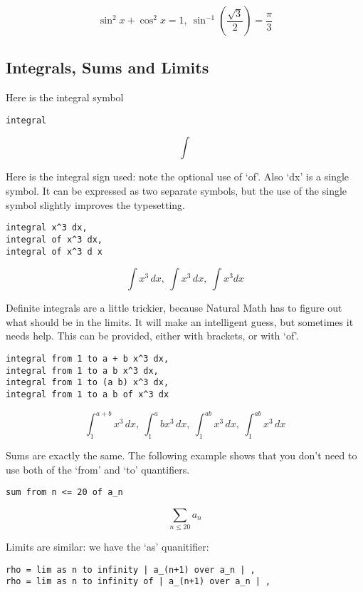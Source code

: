 \documentclass[12pt]{article}
\begin{document}
\[
{\sin} ^ {2} x + {\cos} ^ {2} x = 1 , \ {\sin} ^ { - 1} \left( \frac {\sqrt{3}} {2} \right) = \frac {\pi} {3}
\]

\noindent \subsection{Integrals, Sums and Limits}

\noindent \indent
Here is the integral symbol

\begin{verbatim}
integral
\end{verbatim}

\[
\int
\]

\noindent Here is the integral sign used: note the optional use of `of'.  Also
`dx' is a single symbol.  It can be expressed as two separate symbols,
but the use of the single symbol slightly improves the typesetting.

\begin{verbatim}
integral x^3 dx,
integral of x^3 dx,
integral of x^3 d x
\end{verbatim}

\[
\int {x} ^ {3} \,d x , \ \int {x} ^ {3} \,d x , \ \int {x} ^ {3} d x
\]

\noindent Definite integrals are a little trickier, because Natural Math has to
figure out what should be in the limits.  It will make an intelligent
guess, but
sometimes it needs help.  This can be provided, either with brackets,
or with `of'.

\begin{verbatim}
integral from 1 to a + b x^3 dx,
integral from 1 to a b x^3 dx,
integral from 1 to (a b) x^3 dx,
integral from 1 to a b of x^3 dx
\end{verbatim}

\[
\int _ {1} ^ {a + b} {x} ^ {3} \,d x , \ \int _ {1} ^ {a} b {x} ^ {3} \,d x , \ \int _ {1} ^ {a b} {x} ^ {3} \,d x , \ \int _ {1} ^ {a b} {x} ^ {3} \,d x
\]

\noindent Sums are exactly the same.  The following example shows that you
don't need to use both of the `from' and `to' quantifiers.

\begin{verbatim}
sum from n <= 20 of a_n
\end{verbatim}

\[
\sum _ {n \le 20} {a} _ {n}
\]

\noindent Limits are similar: we have the `as' quanitifier:

\begin{verbatim}
rho = lim as n to infinity | a_(n+1) over a_n | ,
rho = lim as n to infinity of | a_(n+1) over a_n | ,
\end{verbatim}
\end{document}
